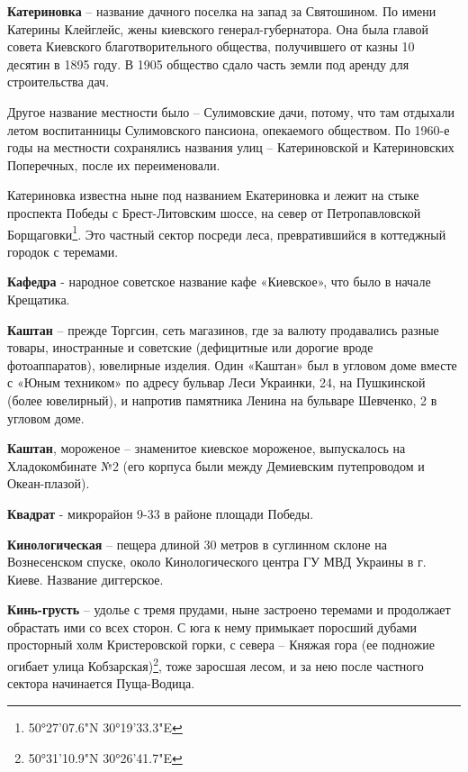 \medskip

\textbf{Катериновка} – название дачного поселка на запад за Святошином. По имени Катерины Клейглейс, жены киевского генерал-губерна\-тора. Она была главой совета Киевского благотворительного общества, получившего от казны 10 десятин в 1895 году. В 1905 общество сдало часть земли под аренду для строительства дач.

Другое название местности было – Сулимовские дачи, потому, что там отдыхали летом воспитанницы Сулимовского пансиона, опекаемого обществом. По 1960-е годы на местности сохранялись названия улиц – Катериновской и Катериновских Поперечных, после их переименовали. 

Катериновка известна ныне под названием Екатериновка и лежит на стыке проспекта Победы с Брест-Литовским шоссе, на север от Петропавловской Борщаговки\footnote{50°27'07.6"N 30°19'33.3"E}. Это частный сектор посреди леса, превратившийся в коттеджный городок с теремами.\\

\medskip


\textbf{Кафедра} - народное советское название кафе «Киевское», что было в начале Крещатика.\\


\medskip


\textbf{Каштан} – прежде Торгсин, сеть магазинов, где за валюту продавались разные товары, иностранные и советские (дефицитные или дорогие вроде фотоаппаратов), ювелирные изделия. Один «Каштан» был в угловом доме вместе с «Юным техником» по адресу бульвар Леси Украинки, 24, на Пушкинской (более ювелирный), и напротив памятника Ленина на бульваре Шевченко, 2 в угловом доме.\\

\medskip

\textbf{Каштан}, мороженое – знаменитое киевское мороженое, выпускалось на Хладокомбинате №2 (его корпуса были между Демиевским путепроводом и Океан-плазой).\\

\medskip

\textbf{Квадрат} - микрорайон 9-33 в районе площади Победы.

\medskip

\textbf{Кинологическая} – пещера длиной 30 метров в суглинном склоне на Вознесенском спуске, около Кинологического центра ГУ МВД Украины в г. Киеве. Название диггерское.\\

\medskip

\textbf{Кинь-грусть} – удолье с тремя прудами, ныне застроено теремами и продолжает обрастать ими со всех сторон. С юга к нему примыкает поросший дубами просторный холм Кристеровской горки, с севера – Княжая гора (ее подножие огибает улица Кобзарская)\footnote{50°31'10.9"N 30°26'41.7"E}, тоже заросшая лесом, и за нею после частного сектора начинается Пуща-Водица. 


